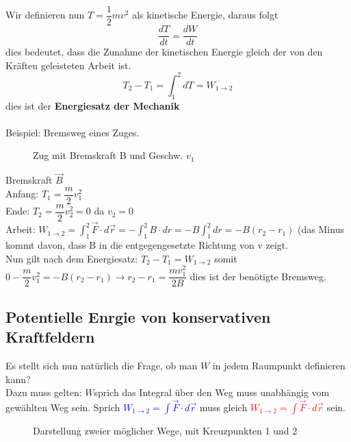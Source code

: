 \documentclass[12pt]{article}
\begin{document}
Wir definieren nun $T = \dfrac{1}{2}mv^2$ als kinetische Energie, daraus folgt
\begin{equation}
\dfrac{dT}{dt} = \dfrac{dW}{dt}
\end{equation}
dies bedeutet, dass die Zunahme der kinetischen Energie gleich der von den Kräften geleisteten Arbeit ist.
\begin{equation}
T_2 - T_1 = \int_1^2 dT = W_{1\rightarrow 2}
\end{equation}
dies ist der \textbf{Energiesatz der Mechanik}\\
\\
Beispiel: Bremsweg eines Zuges.\\
\begin{figure}[H]
  \caption{Zug mit Bremskraft B und Geschw. $v_1$}
  \label{fig:1teil}
\end{figure} 
Bremskraft $\vec{B}$\\
Anfang: $T_1 = \dfrac{m}{2}v_1^2$\\
Ende: $T_2 = \dfrac{m}{2}v_2^2 = 0$ da $v_2 = 0$\\
Arbeit: $W_{1\rightarrow 2} = \int_{1}^2 \vec{F} \cdot d\vec{r} = -\int_{1}^2 B \cdot dr = -B \int_{1}^2 dr = -B(r_2 - r_1)$ (das Minus kommt davon, dass B in die entgegengesetzte Richtung von v zeigt.\\
Nun gilt nach dem Energiesatz: $T_2 - T_1 = W_{1\rightarrow 2}$
somit $0-\dfrac{m}{2}v_1^2 = -B(r_2-r_1) \rightarrow r_2-r_1 = \dfrac{mv_1^2}{2B}$ dies ist der benötigte Bremsweg.

\subsection{Potentielle Enrgie von konservativen Kraftfeldern}
Es stellt sich nun natürlich die Frage, ob man $W$ in jedem Raumpunkt definieren kann?\\
Dazu muss gelten: $W$sprich das Integral über den Weg muss unabhängig vom gewählten Weg sein. Sprich \textcolor{blue}{ $W_{1\rightarrow 2} = \int \vec{F} \cdot d\vec{r}$} muss gleich \textcolor{red}{$W_{1\rightarrow 2} = \int \vec{F} \cdot d\vec{r}$} sein.
\begin{figure}[H]
  \caption{Darstellung zweier möglicher Wege, mit Kreuzpunkten 1 und 2}
  \label{fig:1teil}
\end{figure}
\end{document}
